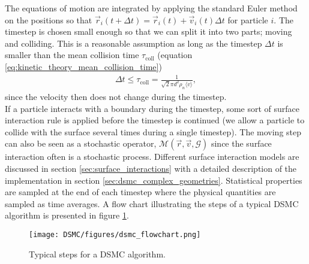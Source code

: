 The equations of motion are integrated by applying the standard Euler method on the positions so that $\vec r_i(t+\Delta t) = \vec r_i(t) + \vec v_i(t)\Delta t$ for particle $i$. The timestep is chosen small enough so that we can split it into two parts; moving and colliding. This is a reasonable assumption as long as the timestep $\Delta t$ is smaller than the mean collision time $\tau_\text{coll}$ (equation \eqref{eq:kinetic_theory_mean_collision_time})
\begin{align}
	\Delta t \leq \tau_\text{coll} = \frac{1}{\sqrt 2 \pi d^2 \rho_n \langle v \rangle},
\end{align}
since the velocity then does not change during the timestep.\\
If a particle interacts with a boundary during the timestep, some sort of surface interaction rule is applied before the timestep is continued (we allow a particle to collide with the surface several times during a single timestep). The moving step can also be seen as a stochastic operator, $\mathcal{M}(\vec r, \vec v, \mathcal{G})$ since the surface interaction often is a stochastic process. Different surface interaction models are discussed in section \ref{sec:surface_interactions} with a detailed description of the implementation in section \ref{sec:dsmc_complex_geometries}. Statistical properties are sampled at the end of each timestep where the physical quantities are sampled as time averages. A flow chart illustrating the steps of a typical DSMC algorithm is presented in figure \ref{fig:dsmc_flowchart}.
\begin{figure}[ht]
\begin{center}
\texttt{[image: DSMC/figures/dsmc\_flowchart.png]}
\end{center}
\caption{Typical steps for a DSMC algorithm.}
\label{fig:dsmc_flowchart}
\end{figure}



